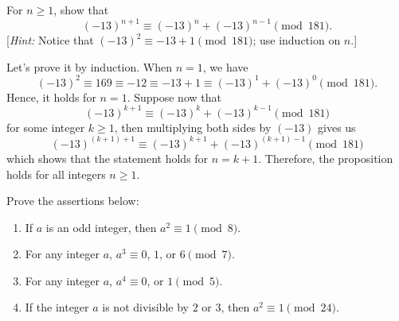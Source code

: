 \begin{exercise}
    For $n\geq 1$, show that
    $$(-13)^{n+1} \equiv (-13)^n + (-13)^{n-1} \pmod{181}.$$
    [\textit{Hint:} Notice that $(-13)^2 \equiv -13 + 1 \pmod{181}$; use induction on $n$.]\\
\end{exercise}

\begin{solution}
    Let's prove it by induction. When $n = 1$, we have
    $$(-13)^2 \equiv 169 \equiv - 12 \equiv -13 + 1 \equiv (-13)^1 + (-13)^0 \pmod{181}.$$
    Hence, it holds for $n = 1$. Suppose now that
    $$(-13)^{k+1} \equiv (-13)^k + (-13)^{k-1} \pmod{181}$$
    for some integer $k \geq 1$, then multiplying both sides by $(-13)$ gives us
    $$(-13)^{(k+1)+1} \equiv (-13)^{k+1} + (-13)^{(k+1)-1} \pmod{181}$$ 
    which shows that the statement holds for $n = k+1$. Therefore, the proposition holds for all integers $n \geq 1$. \\
\end{solution}

\begin{exercise}
    Prove the assertions below:
    \begin{enumerate}
        \item If $a$ is an odd integer, then $a^2 \equiv 1 \pmod{8}$.
        \item For any integer $a$, $a^3 \equiv 0$, $1$, or $6 \pmod 7$.
        \item For any integer $a$, $a^4 \equiv 0$, or $1 \pmod 5$.
        \item If the integer $a$ is not divisible by $2$ or $3$, then $a^2 \equiv 1 \pmod{24}$.
    \end{enumerate}
\end{exercise}

